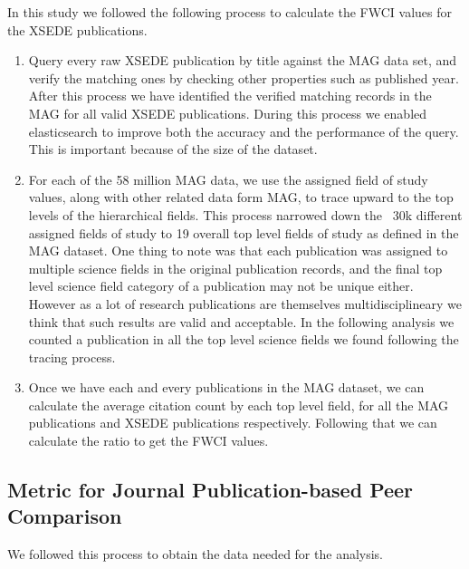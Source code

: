 \documentclass{sig-alternate}
\begin{document}
In this study we followed the following process to calculate the FWCI
values for the XSEDE publications.

\begin{enumerate}
\item Query every raw XSEDE publication by title against the MAG data
  set, and verify the matching ones by checking other properties such
  as published year. After this process we have identified the
  verified matching records in the MAG for all valid XSEDE
  publications.  During this process we enabled elasticsearch to
  improve both the accuracy and the performance of the query.  This is
  important because of the size of the dataset.
\item For each of the 58 million MAG data, we use the assigned field
  of study values, along with other related data form MAG, to trace
  upward to the top levels of the hierarchical fields. This process
  narrowed down the ~30k different assigned fields of study to 19
  overall top level fields of study as defined in the MAG dataset.
  One thing to note was that each publication was assigned to multiple
  science fields in the original publication records, and the final
  top level science field category of a publication may not be unique
  either. However as a lot of research publications are themselves
  multidisciplineary we think that such results are valid and
  acceptable. In the following analysis we counted a publication in
  all the top level science fields we found following the tracing
  process.
\item Once we have each and every publications in the MAG dataset, we
  can calculate the average citation count by each top level field,
  for all the MAG publications and XSEDE publications
  respectively. Following that we can calculate the ratio to get the
  FWCI values.
\end{enumerate}

\subsection{Metric for Journal Publication-based Peer Comparison} \label{S:metric}

We followed this process to obtain the data needed for the analysis.
\end{document}
